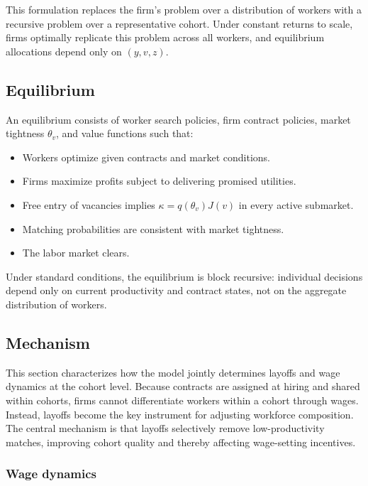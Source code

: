 \medskip

This formulation replaces the firm’s problem over a distribution of workers with a recursive problem over a representative cohort. Under constant returns to scale, firms optimally replicate this problem across all workers, and equilibrium allocations depend only on $(y,v,z)$.


\subsection{Equilibrium}

An equilibrium consists of worker search policies, firm contract policies, market tightness $\theta_v$, and value functions such that:

\begin{itemize}
\item Workers optimize given contracts and market conditions.
\item Firms maximize profits subject to delivering promised utilities.
\item Free entry of vacancies implies $\kappa = q(\theta_v)J(v)$ in every active submarket.
\item Matching probabilities are consistent with market tightness.
\item The labor market clears.
\end{itemize}

Under standard conditions, the equilibrium is block recursive: individual decisions depend only on current productivity and contract states, not on the aggregate distribution of workers.

\subsection{Mechanism}

This section characterizes how the model jointly determines layoffs and wage dynamics at the cohort level. Because contracts are assigned at hiring and shared within cohorts, firms cannot differentiate workers within a cohort through wages. Instead, layoffs become the key instrument for adjusting workforce composition. The central mechanism is that layoffs selectively remove low-productivity matches, improving cohort quality and thereby affecting wage-setting incentives.

\subsubsection*{Wage dynamics}


